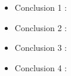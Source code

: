 \documentclass[preprint,12pt]{elsarticle}
\begin{document}
\begin{itemize}

\item Conclusion 1 : \\

\item Conclusion 2 : \\ 

\item Conclusion 3 : \\ 

\item Conclusion 4 : \\ 
\end{itemize}


	
	\newpage
	
		 
	
	
\end{document}
